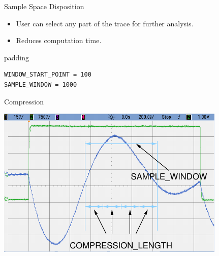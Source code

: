 \documentclass[xcolor=pdftex,dvipsnames,table,final]{beamer}
\begin{document}
\begin{frame}[fragile]{}
\begin{columns}[t]
\begin{column}{.31\linewidth}
\begin{block}{Sample Space Disposition}
\begin{minipage}[t]{0.49\linewidth}
        \end{minipage}%
        \begin{minipage}[t]{0.49\linewidth}%
          \vspace{-6cm}%
          \begin{itemize}
            \item User can select any part of the trace for further analysis.
            \item Reduces computation time.
          \end{itemize} 
          \begin{center}
            \begin{beamercolorbox}[rounded=true]{padding}%
               \footnotesize%
              \begin{lstlisting}
WINDOW_START_POINT = 100
SAMPLE_WINDOW = 1000
              \end{lstlisting}
            \end{beamercolorbox}
          \end{center}
        \end{minipage}
       \end{block}
       \begin{block}{Compression}
        \begin{minipage}[t]{0.49\linewidth}
		\includegraphics[width=0.9\linewidth]{../figures/oscilloscope-compression-window}
        \end{minipage}%
        \begin{minipage}[t]{0.49\linewidth}%
          \vspace{-6.5cm}%
         \begin{itemize}

\end{itemize}
\end{minipage}
\end{block}
\end{column}
\end{columns}
\end{frame}
\end{document}
